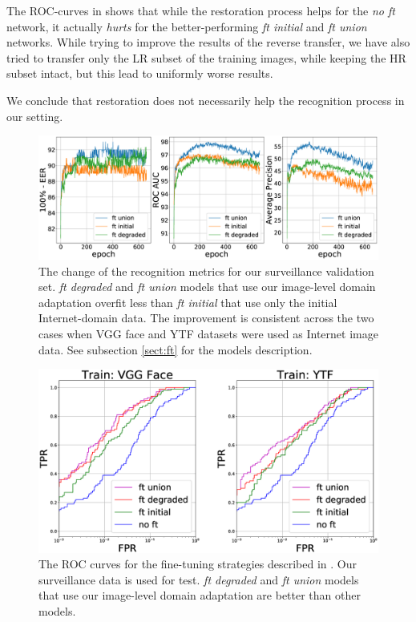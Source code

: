 The ROC-curves in   shows that while the restoration process helps for the \textit{no ft} network, it actually \textit{hurts} for the better-performing \textit{ft initial} and \textit{ft union} networks. While trying to improve the results of the reverse transfer, we have also tried to transfer only the LR subset of the training images, while keeping the HR subset intact, but this lead to uniformly worse results.

We conclude that restoration does not necessarily help the recognition process in our setting. 



\begin{figure}
 \centering
    \includegraphics[width=\linewidth]{Chapters/face/Fig4.eps}
    \caption{The change of the recognition metrics for our surveillance validation set. \textit{ft degraded} and \textit{ft union} models that use our image-level domain adaptation overfit less than \textit{ft initial} that use only the initial Internet-domain data. The improvement is consistent across the two cases when VGG face and YTF datasets were used as Internet image data. See subsection \ref{sect:ft} for the models description.}\label{fig:validation_ytube}
  \end{figure}
  
  \begin{figure}

  \centering
    \includegraphics[width=\linewidth]{Chapters/face/Fig5.eps}
    \caption{The ROC curves for the fine-tuning strategies described in . Our surveillance data is used for test. \textit{ft degraded} and \textit{ft union} models that use our image-level domain adaptation are better than other models. }\label{fig:roc_oxford_ytube}
  \end{figure}
  
